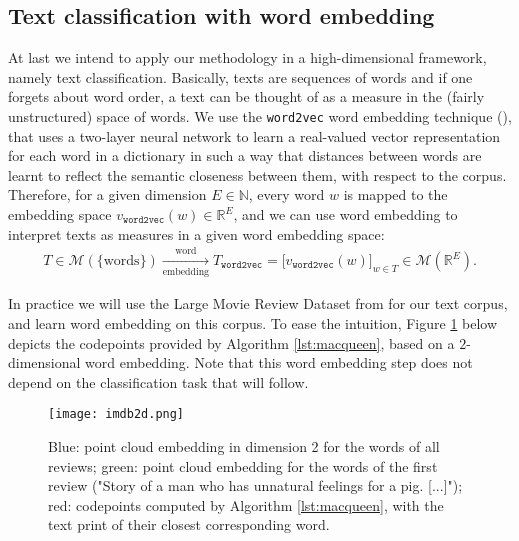 \documentclass[noinfoline,preprint]{article}
\renewcommand{\1}{\mathds 1}
\begin{document}


\subsection{Text classification with word embedding}

At last we intend to apply our methodology in a high-dimensional framework, namely text classification.
Basically, texts are sequences of words and if one forgets about word order, a text can be thought of as a measure in the (fairly unstructured) space of words. We use the \texttt{word2vec} word embedding technique (\cite{Mikolov13}), that uses a two-layer neural network to learn a real-valued vector representation for each word in a dictionary in such a way that distances between words are learnt to reflect the semantic closeness between them, with respect to the corpus. Therefore, for a given dimension $E \in \mathbb{N}$, every word $w$ is mapped to the embedding space $v_{\texttt{word2vec}}(w) \in \mathbb{R}^E$, and we can use word embedding to interpret texts as measures in a given word embedding space:
\begin{align}
T \in \mathcal{M}(\{\text{words}\}) \xrightarrow[\text{embedding}]{\text{word}} T_{\texttt{word2vec}} = \big[ v_{\texttt{word2vec}}(w) \big]_{w \in T} \in \mathcal{M}(\mathbb{R}^{E}).
\label{eq:embedding}
\end{align}

In practice we will use the Large Movie Review Dataset from \cite{imdb} for our text corpus, and learn word embedding on this corpus. To ease the intuition, Figure \ref{fig:imdbquant} below depicts the codepoints provided by Algorithm \ref{lst:macqueen}, based on a $2$-dimensional word embedding. Note that this word embedding step does not depend on the classification task that will follow.

\begin{figure}[h!]
	\centering
	\texttt{[image: imdb2d.png]}
	\caption{Blue: point cloud embedding in dimension 2 for the words of all reviews; green: point cloud embedding for the words of the first review ("Story of a man who has unnatural feelings for a pig. [...]"); red: codepoints computed by Algorithm \ref{lst:macqueen}, with the text print of their closest corresponding word.}
	\label{fig:imdbquant}
\end{figure}
\end{document}

